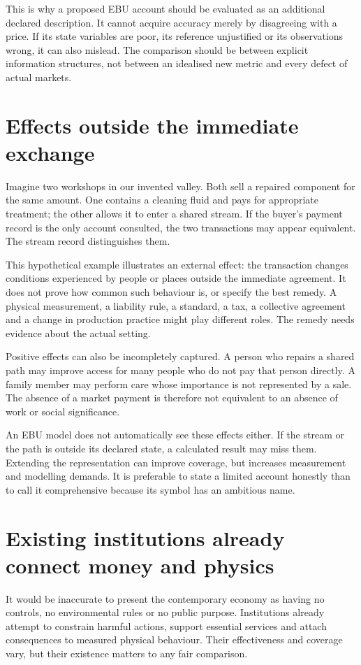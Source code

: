 This is why a proposed EBU account should be evaluated as an additional declared description. It cannot acquire accuracy merely by disagreeing with a price. If its state variables are poor, its reference unjustified or its observations wrong, it can also mislead. The comparison should be between explicit information structures, not between an idealised new metric and every defect of actual markets.

\section{Effects outside the immediate exchange}
Imagine two workshops in our invented valley. Both sell a repaired component for the same amount. One contains a cleaning fluid and pays for appropriate treatment; the other allows it to enter a shared stream. If the buyer's payment record is the only account consulted, the two transactions may appear equivalent. The stream record distinguishes them.

This hypothetical example illustrates an external effect: the transaction changes conditions experienced by people or places outside the immediate agreement. It does not prove how common such behaviour is, or specify the best remedy. A physical measurement, a liability rule, a standard, a tax, a collective agreement and a change in production practice might play different roles. The remedy needs evidence about the actual setting.

Positive effects can also be incompletely captured. A person who repairs a shared path may improve access for many people who do not pay that person directly. A family member may perform care whose importance is not represented by a sale. The absence of a market payment is therefore not equivalent to an absence of work or social significance.

An EBU model does not automatically see these effects either. If the stream or the path is outside its declared state, a calculated result may miss them. Extending the representation can improve coverage, but increases measurement and modelling demands. It is preferable to state a limited account honestly than to call it comprehensive because its symbol has an ambitious name.

\section{Existing institutions already connect money and physics}
It would be inaccurate to present the contemporary economy as having no controls, no environmental rules or no public purpose. Institutions already attempt to constrain harmful actions, support essential services and attach consequences to measured physical behaviour. Their effectiveness and coverage vary, but their existence matters to any fair comparison.

